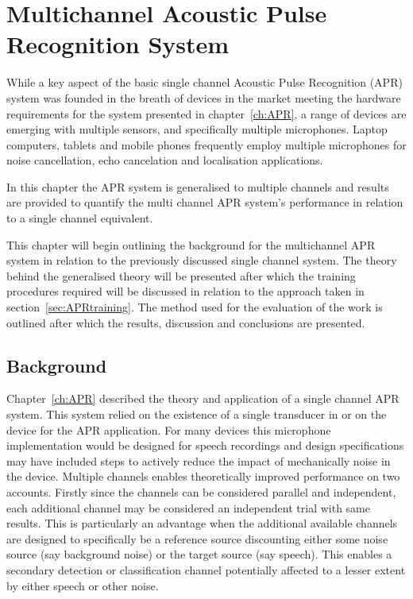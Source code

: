 \chapter{Multichannel Acoustic Pulse Recognition System}\label{ch:MultichannelAPR}

\ifpdf
    \graphicspath{{Chapter4_MultiAPR/Chapter4Figs/PNG/}{Chapter4_MultiAPR/Chapter4Figs/PDF/}{Chapter4_MultiAPR/Chapter4Figs/}{Chapter4_MultiAPR/Chapter4Figs/Training/}}
\else
    \graphicspath{{Chapter4_MultiAPR/Chapter4Figs/EPS/}{Chapter4_MultiAPR/Chapter4Figs/}}
\fi

While a key aspect of the basic single channel Acoustic Pulse Recognition (APR) system was founded in the breath of devices in the market meeting the hardware requirements for the system presented in chapter~\ref{ch:APR}, a range of devices are emerging with multiple sensors, and specifically multiple microphones. Laptop computers, tablets and mobile phones frequently employ multiple microphones for noise cancellation\cite{Habets2013}\cite{Habets2012}, echo cancelation\cite{US7925007} and localisation applications\cite{US8174547}\cite{US8233353}.

In this chapter the APR system is generalised to multiple channels and results are provided to quantify the multi channel APR system's performance in relation to a single channel equivalent.

This chapter will begin outlining the background for the multichannel APR system in relation to the previously discussed single channel system. The theory behind the generalised theory will be presented after which the training procedures required will be discussed in relation to the approach taken in section~\ref{sec:APRtraining}. The method used for the evaluation of the work is outlined after which the results, discussion and conclusions are presented.
\section{Background}
Chapter~\ref{ch:APR} described the theory and application of a single channel APR system. This system relied on the existence of a single transducer in or on the device for the APR application. For many devices this microphone implementation would be designed for speech recordings and design specifications may have included steps to actively reduce the impact of mechanically noise in the device. Multiple channels enables theoretically improved performance on two accounts. Firstly since the channels can be considered parallel and independent, each additional channel may be considered an independent trial with same results. This is particularly an advantage when the additional available channels are designed to specifically be a reference source discounting either some noise source (say background noise) or the target source (say speech). This enables a secondary detection or classification channel potentially affected to a lesser extent by either speech or other noise.

